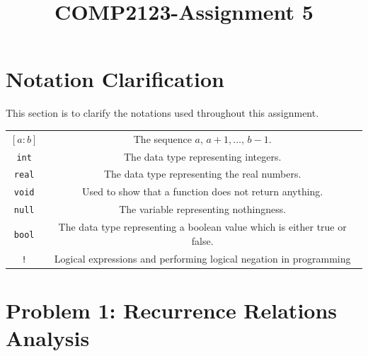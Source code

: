 \documentclass{article}
\title{COMP2123-Assignment 5}
\begin{document}
	\maketitle
	\section*{Notation Clarification}
	This section is to clarify the notations used throughout this assignment.
	
	\begin{center}
		\begin{tabular}{ c c }
			\([a:b]\) & The sequence \(a,\, a + 1, \ldots, \, b - 1\).\\
			\verb|int| & The data type representing integers.\\
			\verb|real| & The data type representing the real numbers.\\
			\verb|void| & Used to show that a function does not return anything.\\
			\verb|null| & The variable representing nothingness.\\
			\verb|bool| & The data type representing a boolean value which is either true or false.\\
			\verb|!| & Logical expressions and performing logical negation in programming\\

		\end{tabular}
	\end{center} 

	\newpage \section*{Problem 1: Recurrence Relations Analysis}
\end{document}
